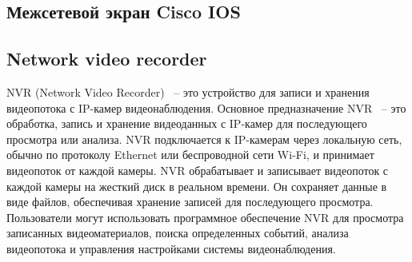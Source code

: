 \subsection{Межсетевой экран Cisco IOS}



\subsection{Network video recorder}

NVR (Network Video Recorder) ~-- это устройство для записи и хранения видеопотока с IP-камер видеонаблюдения. 
Основное предназначение NVR ~-- это обработка, запись и хранение видеоданных с IP-камер для последующего просмотра или анализа.
NVR подключается к IP-камерам через локальную сеть, обычно по протоколу Ethernet или беспроводной сети Wi-Fi, 
и принимает видеопоток от каждой камеры. NVR обрабатывает и записывает видеопоток с каждой камеры на жесткий диск в реальном времени. 
Он сохраняет данные в виде файлов, обеспечивая хранение записей для последующего просмотра.
Пользователи могут использовать программное обеспечение NVR для просмотра записанных видеоматериалов, поиска определенных событий, 
анализа видеопотока и управления настройками системы видеонаблюдения.